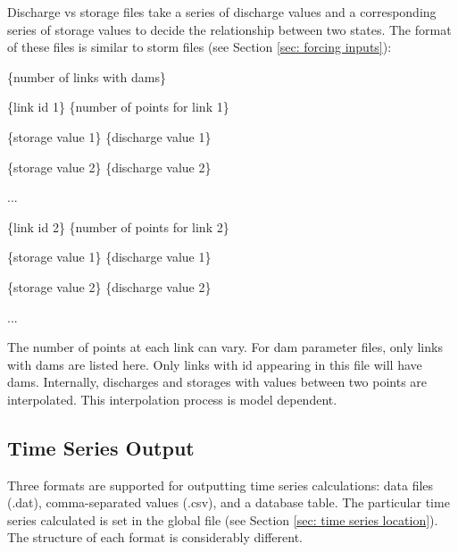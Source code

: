 \documentclass[12pt]{article}
\newenvironment{codeindent}
{\begin{list}{}
        {\setlength{\leftmargin}{.1in}}
        \item[]
}
{\end{list}}
\begin{document}
Discharge vs storage files take a series of discharge values and a corresponding series of storage values to decide the relationship between two states. The format of these files is similar to storm files (see Section \ref{sec: forcing inputs}):
\begin{codeindent}
 \{number of links with dams\}
 
 \{link id 1\} \{number of points for link 1\}
 
 \{storage value 1\} \{discharge value 1\}
 
 \{storage value 2\} \{discharge value 2\}
 
 ...

 \{link id 2\} \{number of points for link 2\}
 
 \{storage value 1\} \{discharge value 1\}
 
 \{storage value 2\} \{discharge value 2\}
 
 ...
\end{codeindent}
The number of points at each link can vary. For dam parameter files, only links with dams are listed here. Only links with id appearing in this file will have dams. Internally, discharges and storages with values between two points are interpolated. This interpolation process is model dependent.


\subsection{Time Series Output} \label{sec: time series output}

Three formats are supported for outputting time series calculations: data files (.dat), comma-separated values (.csv), and a database table. The particular time series calculated is set in the global file (see Section \ref{sec: time series location}). The structure of each format is considerably different.
\end{document}
